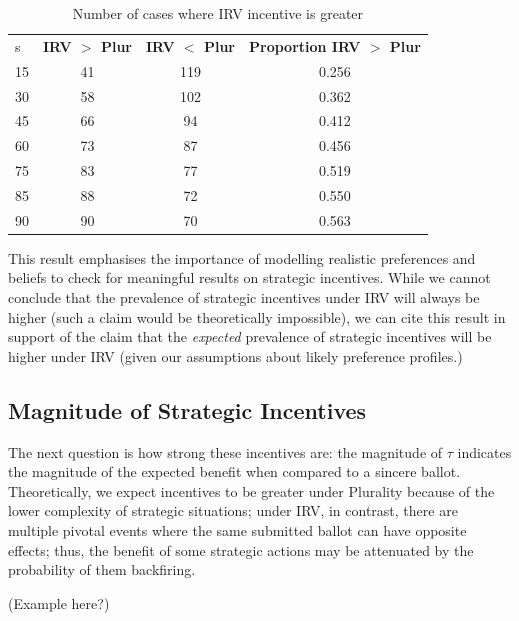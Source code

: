 \documentclass[11pt, letter]{article}
\begin{document}
\begin{table}[!htb]
	\caption{Number of cases where IRV incentive is greater}
	\label{tab:strat_inc}
	\centering

	\begin{tabular}{lccc}
	\toprule
	s & \textbf{IRV $>$ Plur} & \textbf{IRV $<$ Plur} & \textbf{Proportion IRV $>$ Plur} \\
	\cmidrule{2-4}
	15 & 41 & 119 & 0.256 \\
	30 & 58 & 102 & 0.362 \\
	45 & 66 & 94 & 0.412 \\
	60 & 73 & 87 & 0.456 \\
	75 & 83 & 77 & 0.519 \\
	85 & 88 & 72 & 0.550 \\
	90 & 90 & 70 & 0.563 \\
	\bottomrule
	\end{tabular}
\end{table}

This result emphasises the importance of modelling realistic preferences and beliefs to check for meaningful results on strategic incentives. While we cannot conclude that the prevalence of strategic incentives under IRV will always be higher (such a claim would be theoretically impossible), we can cite this result in support of the claim that the \emph{expected} prevalence of strategic incentives will be higher under IRV (given our assumptions about likely preference profiles.)

\subsection{Magnitude of Strategic Incentives}

The next question is how strong these incentives are: the magnitude of $\tau$ indicates the magnitude of the expected benefit when compared to a sincere ballot. Theoretically, we expect incentives to be greater under Plurality because of the lower complexity of strategic situations; under IRV, in contrast, there are multiple pivotal events where the same submitted ballot can have opposite effects; thus, the benefit of some strategic actions may be attenuated by the probability of them backfiring.

(Example here?)
\end{document}
